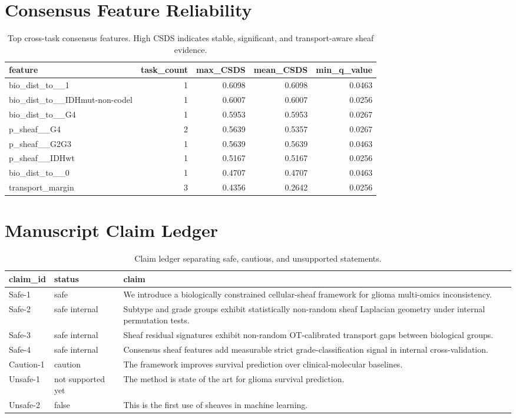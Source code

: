 \documentclass[11pt]{article}
\begin{document}
\section{Consensus Feature Reliability}
\begin{table}[H]
\centering
\small
\begin{tabular}{lrrrr}
\toprule
feature & task\_count & max\_CSDS & mean\_CSDS & min\_q\_value \\
\midrule
bio\_dist\_to\_\_1 & 1 & 0.6098 & 0.6098 & 0.0463 \\
bio\_dist\_to\_\_IDHmut-non-codel & 1 & 0.6007 & 0.6007 & 0.0256 \\
bio\_dist\_to\_\_G4 & 1 & 0.5953 & 0.5953 & 0.0267 \\
p\_sheaf\_\_G4 & 2 & 0.5639 & 0.5357 & 0.0267 \\
p\_sheaf\_\_G2G3 & 1 & 0.5639 & 0.5639 & 0.0463 \\
p\_sheaf\_\_IDHwt & 1 & 0.5167 & 0.5167 & 0.0256 \\
bio\_dist\_to\_\_0 & 1 & 0.4707 & 0.4707 & 0.0463 \\
transport\_margin & 3 & 0.4356 & 0.2642 & 0.0256 \\
\bottomrule
\end{tabular}

\caption{Top cross-task consensus features. High CSDS indicates stable, significant, and transport-aware sheaf evidence.}
\end{table}

\section{Manuscript Claim Ledger}
\begin{table}[H]
\centering
\small
\begin{tabular}{lll}
\toprule
claim\_id & status & claim \\
\midrule
Safe-1 & safe & We introduce a biologically constrained cellular-sheaf framework for glioma multi-omics inconsistency. \\
Safe-2 & safe internal & Subtype and grade groups exhibit statistically non-random sheaf Laplacian geometry under internal permutation tests. \\
Safe-3 & safe internal & Sheaf residual signatures exhibit non-random OT-calibrated transport gaps between biological groups. \\
Safe-4 & safe internal & Consensus sheaf features add measurable strict grade-classification signal in internal cross-validation. \\
Caution-1 & caution & The framework improves survival prediction over clinical-molecular baselines. \\
Unsafe-1 & not supported yet & The method is state of the art for glioma survival prediction. \\
Unsafe-2 & false & This is the first use of sheaves in machine learning. \\
\bottomrule
\end{tabular}

\caption{Claim ledger separating safe, cautious, and unsupported statements.}
\end{table}
\end{document}
